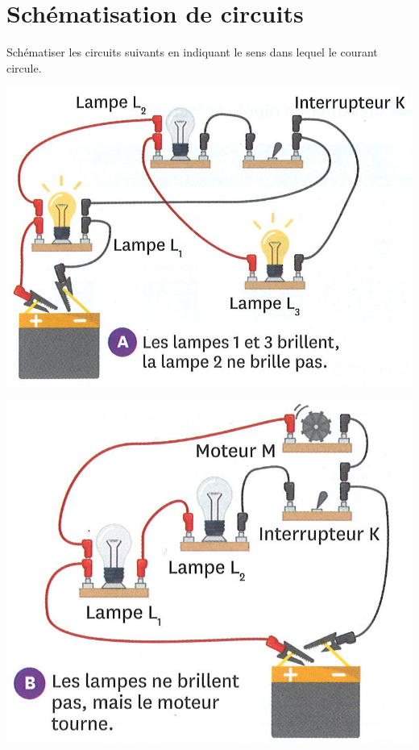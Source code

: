 \section{Schématisation de circuits}

Schématiser les circuits suivants en indiquant le sens dans lequel le courant circule.

\begin{multicols}{2}
	\begin{center}
		\includegraphics[scale=1]{img/schema1}
	\end{center}

	\begin{center}
		\includegraphics[scale=0.35]{img/schema2}
	\end{center}
\end{multicols}